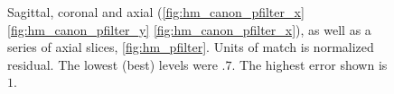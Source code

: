 \begin{figure}[H]
\caption{Sagittal, coronal and axial (\autoref{fig:hm_canon_pfilter_x} \autoref{fig:hm_canon_pfilter_y} 
         \autoref{fig:hm_canon_pfilter_x}), as well as a series of axial slices, \autoref{fig:hm_pfilter}. 
         Units of match is normalized residual. The lowest (best) levels were $.7$.
         The highest error shown is $1$.}
\label{fig:hm_canon_pfilter}
\end{figure}

